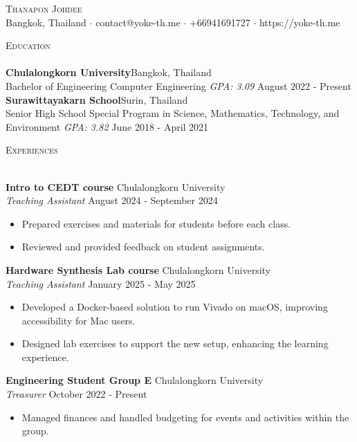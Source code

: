 \documentclass[a4paper]{article}
\newcommand{\lineunder} {
    \vspace*{-8pt} \\
    \hspace*{-18pt} \hrulefill \\
}
\newcommand{\header} [1] {
    {\hspace*{-18pt}\vspace*{6pt} \textsc{#1}}
    \vspace*{-6pt} \lineunder
}
\begin{document}
\vspace*{-40pt}

    

\vspace*{-10pt}
\begin{center}
	{\Huge \scshape {Thanapon Johdee}}\\
	Bangkok, Thailand $\cdot$ contact@yoke-th.me $\cdot$ +66941691727 $\cdot$ https://yoke-th.me\\
\end{center}

\header{Education}
\textbf{Chulalongkorn University}\hfill Bangkok, Thailand\\
Bachelor of Engineering Computer Engineering \textit{GPA: 3.09} \hfill August 2022 - Present\\
\vspace{2mm}
\textbf{Surawittayakarn School}\hfill Surin, Thailand\\
Senior High School Special Program in Science, Mathematics, Technology, and Environment \textit{GPA: 3.82} \hfill June 2018 - April 2021\\
\vspace{2mm}

\header{Experiences}
\vspace{1mm}

\textbf{Intro to CEDT course} \hfill Chulalongkorn University\\
\textit{Teaching Assistant} \hfill August 2024 - September 2024\\
\vspace{-1mm}
\begin{itemize} \itemsep 1pt
	\item Prepared exercises and materials for students before each class.
	\item Reviewed and provided feedback on student assignments.
\end{itemize}
\textbf{Hardware Synthesis Lab course} \hfill Chulalongkorn University\\
\textit{Teaching Assistant} \hfill January 2025 - May 2025\\
\vspace{-1mm}
\begin{itemize} \itemsep 1pt
	\item Developed a Docker-based solution to run Vivado on macOS, improving accessibility for Mac users.
	\item Designed lab exercises to support the new setup, enhancing the learning experience.
\end{itemize}
\textbf{Engineering Student Group E} \hfill Chulalongkorn University\\
\textit{Treasurer} \hfill October 2022 - Present\\
\vspace{-1mm}
\begin{itemize} \itemsep 1pt
	\item Managed finances and handled budgeting for events and activities within the group.
\end{itemize}
\end{document}
